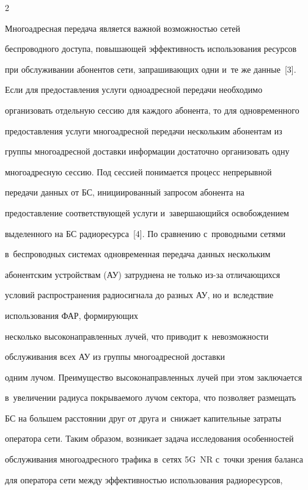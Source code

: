 \begin{multicols}{2}
  

  Многоадресная передача является важ\-ной возможностью сетей 

беспроводного доступа, по\-вы\-ша\-ющей эф\-фек\-тив\-ность использования ресурсов 

при обслуживании абонентов сети, за\-пра\-ши\-ва\-ющих одни и~те же данные~[3]. 

Если для предоставления услуги одноадресной передачи необходимо 

организовать отдельную сессию для каждого абонента, то для одновременного 

предоставления услуги многоадресной передачи нескольким абонентам из 

группы многоадресной до\-став\-ки информации достаточно организовать одну 

многоадресную сессию. Под сессией понимается процесс непрерывной 

передачи данных от БС, ини\-ци\-иро\-ван\-ный запросом абонента на 

предостав\-ле\-ние со\-от\-вет\-ст\-ву\-ющей услуги и~завершающийся освобождением 

выделенного на БС радиоресурса~[4]. По сравнению с~проводными сетями 

в~беспроводных сис\-те\-мах одновременная передача данных нескольким 

абонентским устройствам (АУ) за\-труд\-не\-на не только из-за от\-ли\-ча\-ющих\-ся 

условий распространения радиосигнала до разных АУ, но и~вследствие 

использования ФАР, фор\-ми\-ру\-ющих 

несколько вы\-со\-ко\-на\-прав\-лен\-ных лучей, что приводит к~не\-воз\-мож\-ности 

обслуживания всех АУ из группы многоадресной до\-став\-ки 

одним лучом. Преимущество вы\-со\-ко\-на\-прав\-лен\-ных лучей при этом заключается 

в~увеличении радиуса по\-кры\-ва\-емо\-го лучом сек\-то\-ра, что поз\-во\-ля\-ет размещать 

БС на большем расстоянии друг от друга и~снижает капительные затраты 

оператора сети. Таким образом, возникает задача исследования особенностей 

обслуживания многоадресного трафика в~сетях 5G~NR с~точ\-ки зрения баланса 

для оператора сети между эф\-фек\-тив\-ностью использования радиоресурсов, 


\end{multicols}
